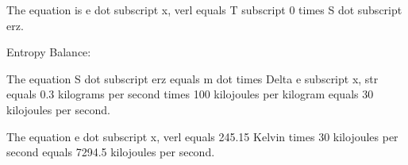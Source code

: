 The equation is e dot subscript x, verl equals T subscript 0 times S dot subscript erz.

Entropy Balance:

The equation S dot subscript erz equals m dot times Delta e subscript x, str equals 0.3 kilograms per second times 100 kilojoules per kilogram equals 30 kilojoules per second.

The equation e dot subscript x, verl equals 245.15 Kelvin times 30 kilojoules per second equals 7294.5 kilojoules per second.